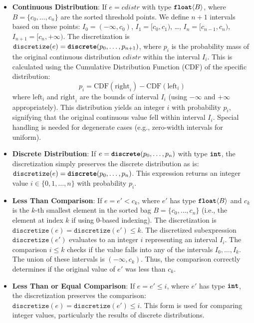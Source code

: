 \documentclass[nonacm,anonymous]{acmart}
\newcommand{\discrete}{\text{\ttfamily\bfseries discrete}}
\newcommand{\intty}{\text{\ttfamily\bfseries int}}
\newcommand{\float}{\text{\ttfamily\bfseries float}}
\begin{document}
\begin{itemize}
    \item \textbf{Continuous Distribution}: If $e = cdistr$ with type $\float\langle B \rangle$, where $B = \{c_0, \dots, c_n\}$ are the sorted threshold points. We define $n+1$ intervals based on these points: $I_0 = (-\infty, c_0)$, $I_1 = [c_0, c_1)$, \dots, $I_n = [c_{n-1}, c_n)$, $I_{n+1} = [c_n, +\infty)$. The discretization is $\texttt{discretize}(e) = \discrete(p_0, \dots, p_{n+1})$, where $p_i$ is the probability mass of the original continuous distribution $cdistr$ within the interval $I_i$. This is calculated using the Cumulative Distribution Function (CDF) of the specific distribution:
    \[ p_i = \text{CDF}(\text{right}_i) - \text{CDF}(\text{left}_i) \]
    where $\text{left}_i$ and $\text{right}_i$ are the bounds of interval $I_i$ (using $-\infty$ and $+\infty$ appropriately). This \discrete{} distribution yields an integer $i$ with probability $p_i$, signifying that the original continuous value fell within interval $I_i$. Special handling is needed for degenerate cases (e.g., zero-width intervals for uniform).

    \item \textbf{Discrete Distribution}: If $e = \discrete(p_0, \ldots, p_n)$ with type $\intty$, the discretization simply preserves the discrete distribution as is: $\texttt{discretize}(e) = \discrete(p_0, \ldots, p_n)$. This expression returns an integer value $i \in \{0, 1, \ldots, n\}$ with probability $p_i$.

    \item \textbf{Less Than Comparison}: If $e = e' < c_k$, where $e'$ has type $\float\langle B \rangle$ and $c_k$ is the $k$-th smallest element in the sorted bag $B = \{c_0, \dots, c_n\}$ (i.e., the element at index $k$ if using 0-based indexing). The discretization is $\texttt{discretize}(e) = \texttt{discretize}(e') \leq k$. The discretized subexpression $\texttt{discretize}(e')$ evaluates to an integer $i$ representing an interval $I_i$. The comparison $i \leq k$ checks if the value falls into any of the intervals $I_0, \dots, I_k$. The union of these intervals is $(-\infty, c_k)$. Thus, the comparison correctly determines if the original value of $e'$ was less than $c_k$.

    \item \textbf{Less Than or Equal Comparison}: If $e = e' \leq i$, where $e'$ has type $\intty$, the discretization preserves the comparison: $\texttt{discretize}(e) = \texttt{discretize}(e') \leq i$. This form is used for comparing integer values, particularly the results of discrete distributions.


\end{itemize}
\end{document}
